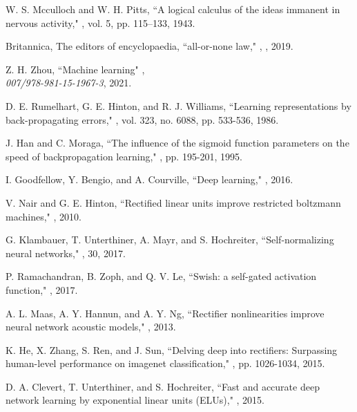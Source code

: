 \documentclass[journal]{IEEEtran}
\begin{document}

\begin{thebibliography}{99}
W. S. Mcculloch and W. H. Pitts,
\newblock ``A logical calculus of the ideas immanent in nervous activity,"
,
\newblock vol. 5, pp. 115--133, 1943.

Britannica,
\newblock The editors of encyclopaedia, ``all-or-none law,"
,
, 2019.


Z. H. Zhou,
\newblock ``Machine learning"
,
\\ {\em 007/978-981-15-1967-3}, 2021.


 D. E. Rumelhart, G. E. Hinton, and R. J. Williams,
 \newblock  ``Learning representations by back-propagating errors,"
, vol. 323, no. 6088, pp. 533-536, 1986.

J. Han and C. Moraga,
\newblock ``The influence of the sigmoid function parameters on the speed of backpropagation learning,"
, pp. 195-201, 1995.


I. Goodfellow, Y. Bengio, and A. Courville,
\newblock  ``Deep learning,"
, 2016.


V. Nair and G. E. Hinton,
\newblock ``Rectified linear units improve restricted boltzmann machines,"
, 2010.


G. Klambauer, T. Unterthiner,  A. Mayr, and S. Hochreiter,
\newblock  ``Self-normalizing neural networks,"
, 30, 2017.


P. Ramachandran, B. Zoph, and Q. V. Le,
\newblock ``Swish: a self-gated activation function,"
, 2017.


A. L. Maas, A. Y. Hannun, and A. Y. Ng,
\newblock  ``Rectifier nonlinearities improve neural network acoustic models,"
, 2013.


K. He,  X. Zhang,  S. Ren, and J. Sun,
  \newblock  ``Delving deep into rectifiers: Surpassing human-level performance on imagenet classification,"
  , pp. 1026-1034,  2015.


D. A. Clevert,  T.  Unterthiner, and S. Hochreiter,
 \newblock  ``Fast and accurate deep network learning by exponential linear units (ELUs),"
 , 2015.


\end{thebibliography}
\end{document}
